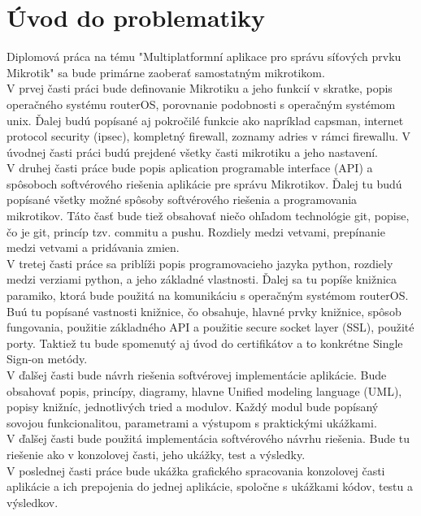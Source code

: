 \chapter{Úvod do problematiky}
Diplomová práca na tému "Multiplatformní aplikace pro správu síťových prvku Mikrotik" sa bude primárne zaoberať samostatným mikrotikom.\\
V prvej časti práci bude definovanie Mikrotiku a jeho funkcií v skratke, popis operačného systému routerOS, porovnanie podobnosti s operačným systémom unix. Ďalej budú popísané aj pokročilé funkcie ako napríklad capsman, internet protocol security (ipsec), kompletný firewall, zoznamy adries v rámci firewallu. V úvodnej časti práci budú prejdené všetky časti mikrotiku a jeho nastavení.\\
V druhej časti práce bude popis aplication programable interface (API) a spôsoboch softvérového riešenia aplikácie pre správu Mikrotikov. Ďalej tu budú popísané všetky možné spôsoby softvérového riešenia a programovania mikrotikov. Táto časť bude tiež obsahovať niečo ohľadom technológie git, popise, čo je git, princíp tzv. commitu a pushu. Rozdiely medzi vetvami, prepínanie medzi vetvami a pridávania zmien.\\
V tretej časti práce sa priblíži popis programovacieho jazyka python, rozdiely medzi verziami python, a jeho základné vlastnosti. Ďalej sa tu popíše knižnica paramiko, ktorá bude použitá na komunikáciu s operačným systémom routerOS. Buú tu popísané vastnosti knižnice, čo obsahuje, hlavné prvky knižnice, spôsob fungovania, použitie základného API a použitie secure socket layer (SSL), použité porty. Taktiež tu bude spomenutý aj úvod do certifikátov a to konkrétne Single Sign-on metódy. \\
V ďalšej časti bude návrh riešenia softvérovej implementácie aplikácie. Bude obsahovať popis, princípy, diagramy, hlavne Unified modeling language (UML), popisy knižníc, jednotlivých tried a modulov. Každý modul bude popísaný sovojou funkcionalitou, parametrami a výstupom s praktickými ukážkami.\\
V ďalšej časti bude použitá implementácia softvérového návrhu riešenia. Bude tu riešenie ako v konzolovej časti, jeho ukážky, test a výsledky. \\
V poslednej časti práce bude ukážka grafického spracovania konzolovej časti aplikácie a ich prepojenia do jednej aplikácie, spoločne s ukážkami kódov, testu  a výsledkov.